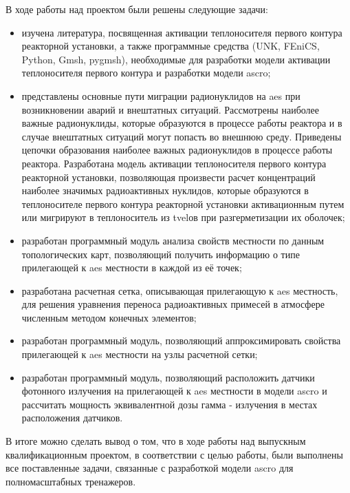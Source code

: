 В ходе работы над проектом были решены следующие задачи:
\begin{itemize}
	\item изучена литература, посвященная активации теплоносителя первого контура реакторной установки, а также 
	программные средства (UNK, FEniCS, Python, Gmsh, pygmsh), необходимые для разработки модели активации теплоносителя 
	первого контура и разработки модели \ac{ascro};
	\item представлены основные пути миграции радионуклидов на \ac{aes} при возникновении аварий и внештатных ситуаций. 
	Рассмотрены наиболее важные радионуклиды, которые образуются в процессе работы реактора и в случае внештатных 
	ситуаций могут попасть во внешнюю среду. Приведены цепочки образования наиболее важных радионуклидов в процессе 
	работы реактора. Разработана модель активации теплоносителя первого контура реакторной установки, позволяющая 
	произвести расчет концентраций наиболее значимых радиоактивных нуклидов, которые образуются в теплоносителе первого 
	контура реакторной установки активационным путем или мигрируют в теплоноситель из \ac{tvel}ов при разгерметизации 
	их оболочек;
	\item разработан программный модуль анализа свойств местности по данным топологических карт, позволяющий получить 
	информацию о типе прилегающей к \ac{aes} местности в каждой из её точек;
	\item разработана расчетная сетка, описывающая прилегающую к \ac{aes} местность, для решения уравнения переноса 
	радиоактивных примесей в атмосфере численным методом конечных элементов;
	\item разработан программный модуль, позволяющий аппроксимировать свойства прилегающей к \ac{aes} местности на узлы 
	расчетной сетки;
	\item разработан программный модуль, позволяющий расположить датчики фотонного излучения на прилегающей к \ac{aes} 
	местности в модели \ac{ascro} и рассчитать мощность эквивалентной дозы гамма - излучения в местах расположения 
	датчиков.
\end{itemize}

В итоге можно сделать вывод о том, что в ходе работы над выпускным квалификационным проектом, в соответствии с целью 
работы, были выполнены все поставленные задачи, связанные с разработкой модели \ac{ascro} для полномасштабных тренажеров.